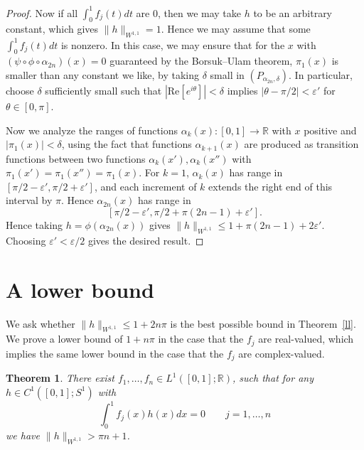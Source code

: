 \documentclass[11pt, reqno, english]{amsart}
\theoremstyle{plain}
\newtheorem{theorem}{Theorem}[section]
\theoremstyle{definition}
\renewcommand{\Re}{\mathrm{Re}}
\begin{document}
\begin{proof}
  Now if all $\int_{0}^{1}f_{j}(t)dt$ are $0$, then we may take $h$ to be an
  arbitrary constant, which gives ${\|h\|_{W^{1, 1}} = 1}$. Hence we may assume
  that some $\int_{0}^{1}f_{j}(t)dt$ is nonzero. In this case, we may ensure
  that for the $x$ with $(\psi \circ \phi \circ \alpha_{2n})(x) = 0$ guaranteed
  by the Borsuk--Ulam theorem, $\pi_{1}(x)$ is smaller than any constant we like, by taking
  $\delta$ small in $(P_{\alpha_{2n}, \delta})$. In particular, choose $\delta$
  sufficiently small such that $|\Re[e^{i\theta}]| < \delta$ implies $|\theta -
  \pi / 2| < \varepsilon'$ for $\theta \in [0, \pi]$.

  Now we analyze the ranges of functions $\alpha_{k}(x)\colon [0, 1]
  \rightarrow \mathbb{R}$ with $x$ positive and $|\pi_{1}(x)| < \delta$, using
  the fact that functions $\alpha_{k + 1}(x)$ are produced as transition
  functions between two functions $\alpha_{k}(x'), \alpha_{k}(x'')$ with
  $\pi_{1}(x') = \pi_{1}(x'') = \pi_{1}(x)$. For $k = 1$, $\alpha_{k}(x)$ has
  range in $[\pi / 2 - \varepsilon', \pi / 2 + \varepsilon']$, and each
  increment of $k$ extends the right end of this interval by $\pi$. Hence
  $\alpha_{2n}(x)$ has range in
  $$[\pi / 2 - \varepsilon', \pi / 2 + \pi (2n - 1) + \varepsilon'].$$
  Hence taking $h = \phi(\alpha_{2n}(x))$ gives $\|h\|_{W^{1, 1}} \le 1 + \pi
  (2n - 1) + 2\varepsilon'$. Choosing $\varepsilon' < \varepsilon / 2$ gives
  the desired result.
\end{proof}
















\section{A lower bound}

We ask whether $\|h\|_{W^{1,1}} \le 1 + 2 n \pi$ is the best possible
bound in Theorem~\ref{ll}. We prove a lower bound of $1 + n \pi$ in the case
that the $f_{j}$ are real-valued, which implies the same lower bound
in the case that the $f_{j}$ are complex-valued.

\begin{theorem}
\label{thm:lowerbound}
  There exist $f_{1}, \ldots , f_{n} \in L^{1}([0, 1]; \mathbb{R})$, such that
  for any $h \in C^{1}([0, 1]; S^{1})$ with
  $$\int_{0}^{1}f_{j}(x)h(x)dx = 0\qquad j = 1, \ldots , n$$
  we have $\|h\|_{W^{1,1}} > \pi n + 1$.
\end{theorem}
\end{document}
